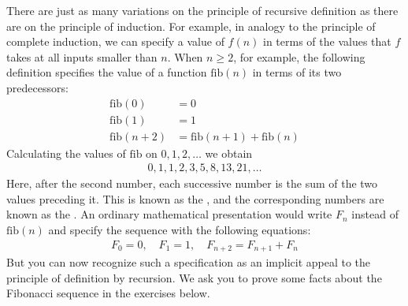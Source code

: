 \documentclass[letterpaper,10pt,english]{sphinxmanual}
\begin{document}
\sphinxAtStartPar
There are just as many variations on the principle of recursive definition as there are on the principle of induction. For example, in analogy to the principle of complete induction, we can specify a value of \(f(n)\) in terms of the values that \(f\) takes at all inputs smaller than \(n\). When \(n \geq 2\), for example, the following definition specifies the value of a function \(\mathrm{fib}(n)\) in terms of its two predecessors:
\begin{equation*}
\begin{split}\mathrm{fib}(0) & = 0 \\
\mathrm{fib}(1) & = 1 \\
\mathrm{fib}(n+2) & = \mathrm{fib}(n + 1) + \mathrm{fib}(n)\end{split}
\end{equation*}
\sphinxAtStartPar
Calculating the values of \(\mathrm{fib}\) on \(0, 1, 2, \ldots\) we obtain
\begin{equation*}
\begin{split}0, 1, 1, 2, 3, 5, 8, 13, 21, \ldots\end{split}
\end{equation*}
\sphinxAtStartPar
Here, after the second number, each successive number is the sum of the two values preceding it. This is known as the , and the corresponding numbers are known as the . An ordinary mathematical presentation would write \(F_n\) instead of \(\mathrm{fib}(n)\) and specify the sequence with the following equations:
\begin{equation*}
\begin{split}F_0 = 0, \quad F_1 = 1, \quad F_{n+2} = F_{n+1} + F_n\end{split}
\end{equation*}
\sphinxAtStartPar
But you can now recognize such a specification as an implicit appeal to the principle of definition by recursion. We ask you to prove some facts about the Fibonacci sequence in the exercises below.
\end{document}
